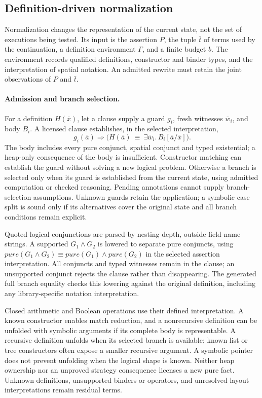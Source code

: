 \subsection{Definition-driven normalization}
\label{sec:normalization-algorithm}

Normalization changes the representation of the current state, not the set of
executions being tested. Its input is the assertion $P$, the tuple $\bar t$ of
terms used by the continuation, a definition environment $\Gamma$, and a finite
budget $b$. The environment records qualified definitions, constructor and
binder types, and the interpretation of spatial notation. An admitted rewrite
must retain the joint observations of $P$ and $\bar t$.

\paragraph{Admission and branch selection.}
For a definition $H(\bar x)$, let a clause supply a guard $g_i$, fresh witnesses
$\bar w_i$, and body $B_i$. A licensed clause establishes, in the selected
interpretation,
\[
 g_i(\bar a) \Longrightarrow
 \bigl(H(\bar a)\ \equiv\ \exists\bar w_i.\,B_i[\bar a/\bar x]\bigr).
\]
The body includes every pure conjunct, spatial conjunct and typed existential;
a heap-only consequence of the body is insufficient. Constructor matching
can establish the guard without solving a new logical problem. Otherwise a
branch is selected only when its guard is established from the current state,
using admitted computation or checked reasoning. Pending annotations cannot
supply branch-selection assumptions. Unknown guards retain the application;
a symbolic case split is sound only if its alternatives cover the original
state and all branch conditions remain explicit.

Quoted logical conjunctions are parsed by nesting depth, outside field-name
strings. A supported $G_1\land G_2$ is lowered to separate pure conjuncts,
using $pure(G_1\land G_2)\equiv pure(G_1)\land pure(G_2)$ in the selected
assertion interpretation. All conjuncts and typed witnesses remain in the
clause; an unsupported conjunct rejects the clause rather than disappearing.
The generated full branch equality checks this lowering against the original
definition, including any library-specific notation interpretation.

Closed arithmetic and Boolean operations use their defined interpretation.
A known constructor enables match reduction, and a nonrecursive definition can
be unfolded with symbolic arguments if its complete body is representable.
A recursive definition unfolds when its selected branch is available; known
list or tree constructors often expose a smaller recursive argument. A
symbolic pointer does not prevent unfolding when the logical shape is known.
Neither heap ownership nor an unproved strategy consequence licenses a new
pure fact. Unknown definitions, unsupported binders or operators, and unresolved
layout interpretations remain residual terms.

